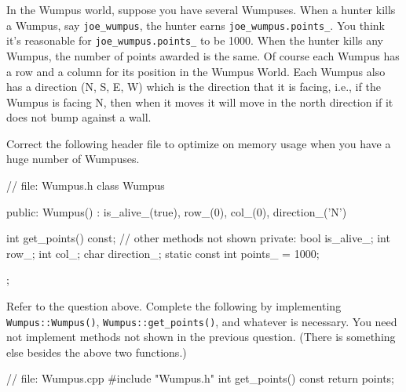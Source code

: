 

\nextq
In the Wumpus world, suppose you have several Wumpuses.
When a hunter kills a Wumpus, say \verb!joe_wumpus!, the hunter earns
\verb!joe_wumpus.points_!.
You think it's reasonable for
\verb!joe_wumpus.points_! to be 1000.
When the hunter kills any Wumpus, the number of points
awarded is the same.
Of course each Wumpus has a row and a column for its position in the
Wumpus World.
Each Wumpus also has a direction (N, S, E, W) which is the direction
that it is facing, i.e., if the Wumpus is facing N, then when it moves
it will move in the north direction if it does not bump against a wall.

Correct the following header file to optimize on memory usage
when you have a huge number of Wumpuses.
\\
\ANSWER
\begin{answercode}
// file: Wumpus.h
class Wumpus
{
public:
    Wumpus()
    : is_alive_(true), row_(0), col_(0), direction_('N')
    {}
    
    int get_points() const;
    // other methods not shown
private:
    bool is_alive_;
    int row_;
    int col_;
    char direction_;
    static const int points_ = 1000;
};
\end{answercode}

\nextq
Refer to the question above.
Complete the following by implementing
\verb!Wumpus::Wumpus()!,
\verb!Wumpus::get_points()!, and whatever is necessary.
You need not implement methods not shown in the previous question.
(There is something else besides the above two functions.)
\\
\ANSWER
\begin{answercode}
// file: Wumpus.cpp
#include "Wumpus.h"
int get_points() const
{
  return points;
}

\end{answercode}


